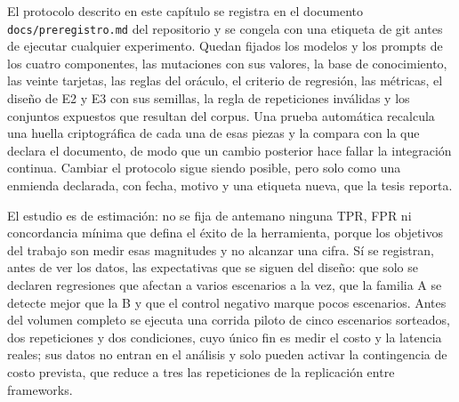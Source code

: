 El protocolo descrito en este capítulo se registra en el documento \texttt{docs/preregistro.md} del repositorio y se congela con una etiqueta de git antes de ejecutar cualquier experimento. Quedan fijados los modelos y los prompts de los cuatro componentes, las mutaciones con sus valores, la base de conocimiento, las veinte tarjetas, las reglas del oráculo, el criterio de regresión, las métricas, el diseño de E2 y E3 con sus semillas, la regla de repeticiones inválidas y los conjuntos expuestos que resultan del corpus. Una prueba automática recalcula una huella criptográfica de cada una de esas piezas y la compara con la que declara el documento, de modo que un cambio posterior hace fallar la integración continua. Cambiar el protocolo sigue siendo posible, pero solo como una enmienda declarada, con fecha, motivo y una etiqueta nueva, que la tesis reporta.
\par
El estudio es de estimación: no se fija de antemano ninguna TPR, FPR ni concordancia mínima que defina el éxito de la herramienta, porque los objetivos del trabajo son medir esas magnitudes y no alcanzar una cifra. Sí se registran, antes de ver los datos, las expectativas que se siguen del diseño: que solo se declaren regresiones que afectan a varios escenarios a la vez, que la familia A se detecte mejor que la B y que el control negativo marque pocos escenarios. Antes del volumen completo se ejecuta una corrida piloto de cinco escenarios sorteados, dos repeticiones y dos condiciones, cuyo único fin es medir el costo y la latencia reales; sus datos no entran en el análisis y solo pueden activar la contingencia de costo prevista, que reduce a tres las repeticiones de la replicación entre frameworks.
\par
